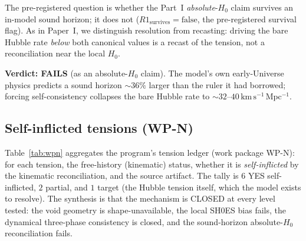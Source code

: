 \documentclass[aps,prd,twocolumn,nofootinbib,superscriptaddress,floatfix]{revtex4-2}
\newcommand{\Ho}{H_{0}}
\newcommand{\kmsmpc}{\,\mathrm{km\,s^{-1}\,Mpc^{-1}}}
\begin{document}
The pre-registered question is whether the Part~I \emph{absolute}-$\Ho$ claim
survives an in-model sound horizon; it does not
($R1_{\mathrm{survives}}=\mathrm{false}$, the pre-registered survival flag). As in
Paper~I, we distinguish resolution from
recasting: driving the bare Hubble rate \emph{below} both canonical values is a
recast of the tension, not a reconciliation near the local $\Ho$.

\textbf{Verdict: FAILS} (as an absolute-$\Ho$ claim). The model's own
early-Universe physics predicts a sound horizon $\sim\!36\%$ larger than the
ruler it had borrowed; forcing self-consistency collapses the bare Hubble rate to
$\sim\!32$--$40\kmsmpc$.

\subsection{Self-inflicted tensions (WP-N)}
\label{subsec:wpn}

Table~\ref{tab:wpn} aggregates the program's tension ledger (work package WP-N):
for each tension, the free-history (kinematic) status, whether it is
\emph{self-inflicted} by the
kinematic reconciliation, and the source artifact. The tally is $6$ YES
self-inflicted, $2$ partial, and $1$ target (the Hubble tension itself, which the
model exists to resolve). The synthesis is that the mechanism is CLOSED at every
level tested: the void geometry is shape-unavailable, the local SH0ES bias fails,
the dynamical three-phase consistency is closed, and the sound-horizon
absolute-$\Ho$ reconciliation fails.
\end{document}
